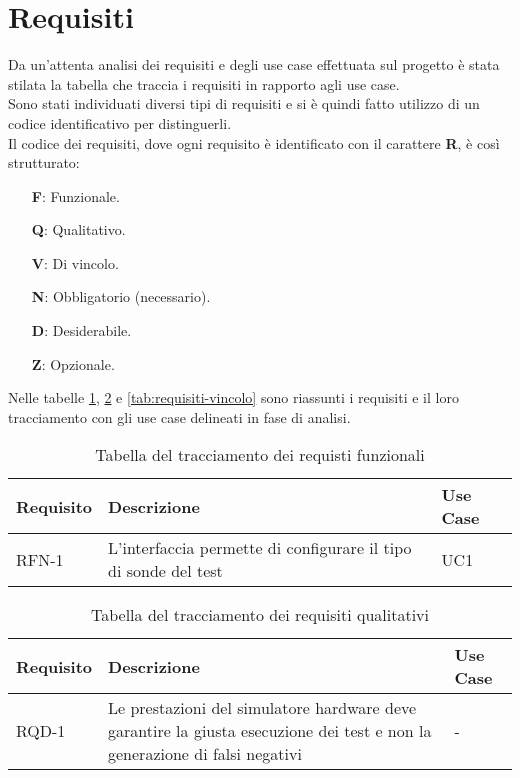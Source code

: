 \section{Requisiti}

Da un'attenta analisi dei requisiti e degli use case effettuata sul progetto è stata stilata la tabella che traccia i requisiti in rapporto agli use case.\\
Sono stati individuati diversi tipi di requisiti e si è quindi fatto utilizzo di un codice identificativo per distinguerli.\\
Il codice dei requisiti, dove ogni requisito è identificato con il carattere \textbf{R}, è così strutturato:

\begin{enumerate}
    \item[\textbf{F}:] Funzionale.
    \item[\textbf{Q}:] Qualitativo.
    \item[\textbf{V}:] Di vincolo.
    \item[\textbf{N}:] Obbligatorio (necessario).
    \item[\textbf{D}:] Desiderabile.
    \item[\textbf{Z}:] Opzionale.
\end{enumerate}

Nelle tabelle \ref{tab:requisiti-funzionali}, \ref{tab:requisiti-qualitativi} e \ref{tab:requisiti-vincolo} sono riassunti i requisiti e il loro tracciamento con gli use case delineati in fase di analisi.

\begin{table}[h]
\begin{tabularx}{\textwidth}{lXl}
\hline
    \textbf{Requisito} & \textbf{Descrizione} & \textbf{Use Case}\\
    \hline
    RFN-1 & L'interfaccia permette di configurare il tipo di sonde del test & UC1\\
\hline
\end{tabularx}
\vspace{4pt}
\caption{Tabella del tracciamento dei requisti funzionali}
\label{tab:requisiti-funzionali}
\end{table}

\begin{table}[h]
\begin{tabularx}{\textwidth}{lXl}
\hline
    \textbf{Requisito} & \textbf{Descrizione} & \textbf{Use Case}\\
    \hline
    RQD-1    & Le prestazioni del simulatore hardware deve garantire la giusta esecuzione dei test e non la generazione di falsi negativi & - \\
\hline
\end{tabularx}
\vspace{4pt}
\caption{Tabella del tracciamento dei requisiti qualitativi}
\label{tab:requisiti-qualitativi}
\end{table}

